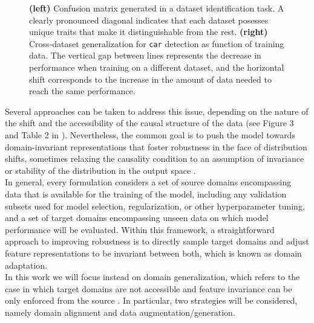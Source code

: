 \begin{figure}[H]
\begin{subfigure}[b]{0.32\textwidth}
    \end{subfigure}
       \caption{
        \textbf{(left)} Confusion matrix generated in a dataset
        identification task. A clearly pronounced diagonal 
        indicates that each dataset posesses unique traits that
        make it distinguishable from the rest.
        \textbf{(right)} Cross-dataset generalization
        for \texttt{car} detection as function of training data. 
        The vertical gap between lines represents the decrease in performance 
        when training on a different dataset, and the horizontal 
        shift corresponds to the increase in the amount of data needed 
        to reach the same performance.
        \cite{torralbaUnbiasedLookDataset2011}}
       \label{fig:dataset_bias}
\end{figure}

Several approaches can be taken to address this issue, depending
on the nature of the shift and the accessibility of the
causal structure of the data (see Figure 3 and Table 2 in 
\cite{wangGeneralizingUnseenDomains2022}).
Nevertheless, the common goal is to push the model towards
domain-invariant representations that foster robustness in the
face of distribution shifts, sometimes relaxing the causality condition
to an assumption of invariance or stability of the distribution in the output space
\cite{wangGeneralizingUnseenDomains2022,liuOutOfDistributionGeneralizationSurvey2023}. \\

In general, every formulation considers a set of source domains 
encompassing data that is available for the training of the model,
including any validation subsets used for model selection, 
regularization, or other hyperparameter tuning, and a set of target 
domains encompassing unseen data on which model performance will
be evaluated. Within this framework, a straightforward approach
to improving robustness is to directly sample target domains
and adjust feature representations to be invariant 
between both, which is known as domain adaptation. \\

In this work we will focus instead on domain generalization, which 
refers to the case in which target domains are not accessible 
and feature invariance can be only enforced 
from the source
\cite{blanchardGeneralizingSeveralRelated}. In particular, two strategies will be considered, 
namely domain alignment and data augmentation/generation. \\

